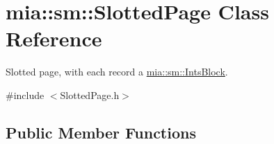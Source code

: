 \hypertarget{classmia_1_1sm_1_1_slotted_page}{\section{mia\-:\-:sm\-:\-:Slotted\-Page Class Reference}
\label{classmia_1_1sm_1_1_slotted_page}
}


Slotted page, with each record a \hyperlink{classmia_1_1sm_1_1_ints_block}{mia\-::sm\-::\-Ints\-Block}.  




{\ttfamily \#include $<$Slotted\-Page.\-h$>$}

\subsection*{Public Member Functions}
